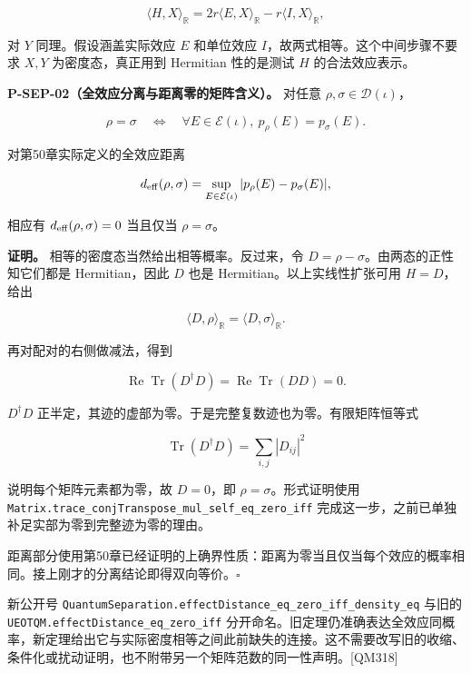 \documentclass[
  11pt,
  oneside]{book}
\begin{document}
\[
\langle H,X\rangle_{\mathbb R}
=2r\langle E,X\rangle_{\mathbb R}
-r\langle I,X\rangle_{\mathbb R},
\]

对 \(Y\) 同理。假设涵盖实际效应 \(E\) 和单位效应
\(I\)，故两式相等。这个中间步骤不要求 \(X,Y\) 为密度态，真正用到
Hermitian 性的是测试 \(H\) 的合法效应表示。

\protect\hypertarget{p-sep-02}{}{}

\textbf{P-SEP-02（全效应分离与距离零的矩阵含义）。} 对任意
\(\rho,\sigma\in\mathcal D(\iota)\)，

\[
\rho=\sigma
\quad\Longleftrightarrow\quad
\forall E\in\mathcal E(\iota),\ p_\rho(E)=p_\sigma(E).
\]

对第50章实际定义的全效应距离

\[
d_{\rm eff}(\rho,\sigma)
=\sup_{E\in\mathcal E(\iota)}
|p_\rho(E)-p_\sigma(E)|,
\]

相应有 \(d_{\rm eff}(\rho,\sigma)=0\) 当且仅当 \(\rho=\sigma\)。

\textbf{证明。} 相等的密度态当然给出相等概率。反过来，令
\(D=\rho-\sigma\)。由两态的正性知它们都是 Hermitian，因此 \(D\) 也是
Hermitian。以上实线性扩张可用 \(H=D\)，给出

\[
\langle D,\rho\rangle_{\mathbb R}
=\langle D,\sigma\rangle_{\mathbb R}.
\]

再对配对的右侧做减法，得到

\[
\operatorname{Re}\operatorname{Tr}(D^\dagger D)
=\operatorname{Re}\operatorname{Tr}(DD)=0.
\]

\(D^\dagger D\)
正半定，其迹的虚部为零。于是完整复数迹也为零。有限矩阵恒等式

\[
\operatorname{Tr}(D^\dagger D)
=\sum_{i,j}|D_{ij}|^2
\]

说明每个矩阵元素都为零，故 \(D=0\)，即 \(\rho=\sigma\)。形式证明使用
\texttt{Matrix.\allowbreak trace\_\allowbreak conj\allowbreak Transpose\_\allowbreak mul\_\allowbreak self\_\allowbreak eq\_\allowbreak zero\_\allowbreak iff}
完成这一步，之前已单独补足实部为零到完整迹为零的理由。

距离部分使用第50章已经证明的上确界性质：距离为零当且仅当每个效应的概率相同。接上刚才的分离结论即得双向等价。\(\square\)

新公开号
\texttt{Quantum\allowbreak Separation.\allowbreak effect\allowbreak Distance\_\allowbreak eq\_\allowbreak zero\_\allowbreak iff\_\allowbreak density\_\allowbreak eq}
与旧的 \texttt{UEOTQM.\allowbreak effect\allowbreak Distance\_\allowbreak eq\_\allowbreak zero\_\allowbreak iff}
分开命名。旧定理仍准确表达全效应同概率，新定理给出它与实际密度相等之间此前缺失的连接。这不需要改写旧的收缩、条件化或扰动证明，也不附带另一个矩阵范数的同一性声明。{[}QM318{]}
\end{document}
